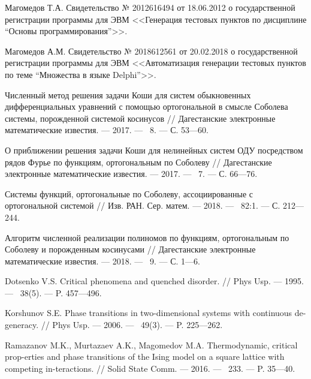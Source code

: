 \begin{thebibliography}{111}
Магомедов Т.А. Свидетельство № 2012616494 от 18.06.2012 о государственной регистрации программы для ЭВМ <<Генерация тестовых пунктов по дисциплине “Основы программирования”>>.

Магомедов А.М. Свидетельство № 2018612561 от 20.02.2018 о государственной регистрации программы для ЭВМ <<Автоматизация генерации тестовых пунктов по теме “Множества в языке Delphi”>>.






 Численный метод решения задачи Коши для систем обыкновенных дифференциальных уравнений с помощью ортогональной в смысле Соболева системы, порожденной системой косинусов // Дагестанские электронные математические известия. --- 2017. --- \No\ 8. --- С. 53---60.

 О приближении решения задачи Коши для нелинейных систем ОДУ посредством рядов Фурье по функциям, ортогональным по Соболеву // Дагестанские электронные математические известия. --- 2017. --- \No\ 7. --- С. 66---76.

 Системы функций, ортогональные по Соболеву, ассоциированные с ортогональной системой // Изв. РАН. Сер. матем. --- 2018. --- \No\  82:1. --- С. 212---244.

 Алгоритм численной реализации полиномов по функциям, ортогональным по Соболеву и порожденным косинусами // Дагестанские электронные математические известия. --- 2018. --- \No\ 9. --- С. 1---6.










Dotsenko V.S. Critical phenomena and quenched disorder. //
Phys Usp. --- 1995. --- \No\ 38(5). --- P. 457---496.

Korshunov S.E. Phase transitions in two-dimensional systems with continuous de-generacy. //
Phys Usp. --- 2006. --- \No\ 49(3). --- P. 225–--262.

Ramazanov M.K., Murtazaev A.K., Magomedov M.A.
Thermodynamic, critical prop-erties and phase transitions of the Ising model on a square lattice with competing in-teractions. // 
Solid State Comm. --- 2016. --- \No\ 233. --- P. 35---40.


\end{thebibliography}
